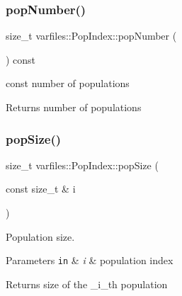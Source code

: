 \subsubsection{\texorpdfstring{pop\+Number()}{popNumber()}\hspace{0.1cm}{\footnotesize\ttfamily [2/2]}}
{\footnotesize\ttfamily size\+\_\+t varfiles\+::\+Pop\+Index\+::pop\+Number (\begin{DoxyParamCaption}{ }\end{DoxyParamCaption}) const\hspace{0.3cm}{\ttfamily [inline]}}



{\ttfamily const} number of populations 

\begin{DoxyReturn}{Returns}
number of populations 
\end{DoxyReturn}
\mbox{\label{classvarfiles_1_1_pop_index_a784669c55259efb8c5b7cdffe4f3c39b}} 
\subsubsection{\texorpdfstring{pop\+Size()}{popSize()}\hspace{0.1cm}{\footnotesize\ttfamily [1/2]}}
{\footnotesize\ttfamily size\+\_\+t varfiles\+::\+Pop\+Index\+::pop\+Size (\begin{DoxyParamCaption}\item[{const size\+\_\+t \&}]{i }\end{DoxyParamCaption})\hspace{0.3cm}{\ttfamily [inline]}}



Population size. 


\begin{DoxyParams}[1]{Parameters}
\mbox{\tt in}  & {\em i} & population index \\
\hline
\end{DoxyParams}
\begin{DoxyReturn}{Returns}
size of the \+\_\+i\+\_\+th population 
\end{DoxyReturn}
\mbox{\label{classvarfiles_1_1_pop_index_a6161e78ceb0c2914ccfe49350b675544}} 
